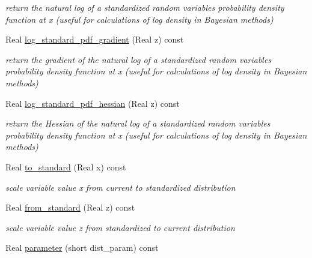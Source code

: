 \begin{DoxyCompactItemize}
\begin{DoxyCompactList}\small\item\em return the natural log of a standardized random variable\textquotesingle{}s probability density function at x (useful for calculations of log density in Bayesian methods) \end{DoxyCompactList}\item 
Real \hyperlink{classPecos_1_1ExponentialRandomVariable_a73ea75d51f5415f600bebbca4a9628b7}{log\+\_\+standard\+\_\+pdf\+\_\+gradient} (Real z) const \label{classPecos_1_1ExponentialRandomVariable_a73ea75d51f5415f600bebbca4a9628b7}

\begin{DoxyCompactList}\small\item\em return the gradient of the natural log of a standardized random variable\textquotesingle{}s probability density function at x (useful for calculations of log density in Bayesian methods) \end{DoxyCompactList}\item 
Real \hyperlink{classPecos_1_1ExponentialRandomVariable_acf89562740c674e54901e97817f56b69}{log\+\_\+standard\+\_\+pdf\+\_\+hessian} (Real z) const \label{classPecos_1_1ExponentialRandomVariable_acf89562740c674e54901e97817f56b69}

\begin{DoxyCompactList}\small\item\em return the Hessian of the natural log of a standardized random variable\textquotesingle{}s probability density function at x (useful for calculations of log density in Bayesian methods) \end{DoxyCompactList}\item 
Real \hyperlink{classPecos_1_1ExponentialRandomVariable_a42e98c7343a1ce031f5481c11476fa73}{to\+\_\+standard} (Real x) const \label{classPecos_1_1ExponentialRandomVariable_a42e98c7343a1ce031f5481c11476fa73}

\begin{DoxyCompactList}\small\item\em scale variable value x from current to standardized distribution \end{DoxyCompactList}\item 
Real \hyperlink{classPecos_1_1ExponentialRandomVariable_a05e16ccd21e4fe4f3f74a1a98ae9dc74}{from\+\_\+standard} (Real z) const \label{classPecos_1_1ExponentialRandomVariable_a05e16ccd21e4fe4f3f74a1a98ae9dc74}

\begin{DoxyCompactList}\small\item\em scale variable value z from standardized to current distribution \end{DoxyCompactList}\item 
Real \hyperlink{classPecos_1_1ExponentialRandomVariable_aa891dab1ae9a225f493e3a0e5032b778}{parameter} (short dist\+\_\+param) const \label{classPecos_1_1ExponentialRandomVariable_aa891dab1ae9a225f493e3a0e5032b778}


\end{DoxyCompactItemize}
